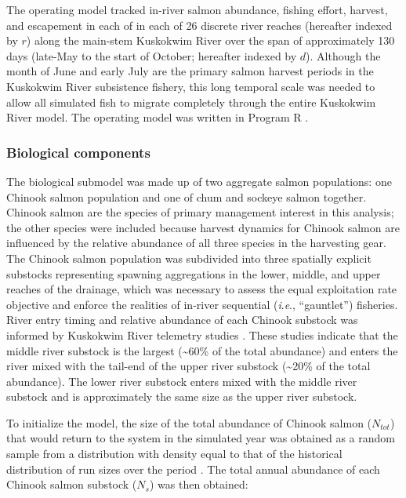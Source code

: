 \documentclass[12pt,]{book}
\theoremstyle{definition}
\theoremstyle{definition}
\theoremstyle{definition}
\theoremstyle{remark}
\begin{document}
The operating model tracked in-river salmon abundance, fishing effort,
harvest, and escapement in each of in each of 26 discrete river reaches
(hereafter indexed by \(r\)) along the main-stem Kuskokwim River over
the span of approximately 130 days (late-May to the start of October;
hereafter indexed by \(d\)). Although the month of June and early July
are the primary salmon harvest periods in the Kuskokwim River
subsistence fishery, this long temporal scale was needed to allow all
simulated fish to migrate completely through the entire Kuskokwim River
model. The operating model was written in Program R \citep{r-cite}.

\subsubsection{Biological components}\label{om-biology}

\noindent
The biological submodel was made up of two aggregate salmon populations:
one Chinook salmon population and one of chum and sockeye salmon
together. Chinook salmon are the species of primary management interest
in this analysis; the other species were included because harvest
dynamics for Chinook salmon are influenced by the relative abundance of
all three species in the harvesting gear. The Chinook salmon population
was subdivided into three spatially explicit substocks representing
spawning aggregations in the lower, middle, and upper reaches of the
drainage, which was necessary to assess the equal exploitation rate
objective and enforce the realities of in-river sequential
(\emph{i}.\emph{e}., ``gauntlet'') fisheries. River entry timing and
relative abundance of each Chinook substock was informed by Kuskokwim
River telemetry studies
\citep{stuby-2007, smith-liller-2017a, smith-liller-2017b}. These
studies indicate that the middle river substock is the largest
(\textasciitilde{}60\% of the total abundance) and enters the river
mixed with the tail-end of the upper river substock
(\textasciitilde{}20\% of the total abundance). The lower river substock
enters mixed with the middle river substock and is approximately the
same size as the upper river substock.

To initialize the model, the size of the total abundance of Chinook
salmon (\(N_{tot}\)) that would return to the system in the simulated
year was obtained as a random sample from a distribution with density
equal to that of the historical distribution of run sizes over the
period \citep[1976 -- 2017; as presented in][ and further described in
Appendix \ref{mse-data-N}]{liller-etal-2018}. The total annual abundance
of each Chinook salmon substock (\(N_s\)) was then obtained:
\end{document}
